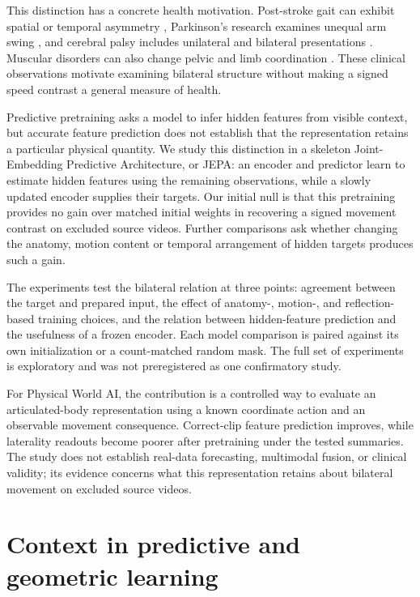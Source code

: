 \documentclass{article}
\begin{document}
This distinction has a concrete health motivation. Post-stroke gait can exhibit spatial or temporal asymmetry \citep{ref01}, Parkinson's research examines unequal arm swing \citep{ref02}, and cerebral palsy includes unilateral and bilateral presentations \citep{ref03}. Muscular disorders can also change pelvic and limb coordination \citep{ref04}. These clinical observations motivate examining bilateral structure without making a signed speed contrast a general measure of health.

Predictive pretraining asks a model to infer hidden features from visible context, but accurate feature prediction does not establish that the representation retains a particular physical quantity. We study this distinction in a skeleton Joint-Embedding Predictive Architecture, or JEPA: an encoder and predictor learn to estimate hidden features using the remaining observations, while a slowly updated encoder supplies their targets. Our initial null is that this pretraining provides no gain over matched initial weights in recovering a signed movement contrast on excluded source videos. Further comparisons ask whether changing the anatomy, motion content or temporal arrangement of hidden targets produces such a gain.

The experiments test the bilateral relation at three points: agreement between the target and prepared input, the effect of anatomy-, motion-, and reflection-based training choices, and the relation between hidden-feature prediction and the usefulness of a frozen encoder. Each model comparison is paired against its own initialization or a count-matched random mask. The full set of experiments is exploratory and was not preregistered as one confirmatory study.

For Physical World AI, the contribution is a controlled way to evaluate an articulated-body representation using a known coordinate action and an observable movement consequence. Correct-clip feature prediction improves, while laterality readouts become poorer after pretraining under the tested summaries. The study does not establish real-data forecasting, multimodal fusion, or clinical validity; its evidence concerns what this representation retains about bilateral movement on excluded source videos.

\section{Context in predictive and geometric learning}\label{context-in-predictive-and-geometric-learning}
\end{document}
